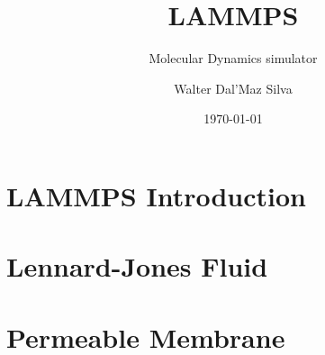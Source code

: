 \documentclass[aspectratio=169]{beamer}
\title{LAMMPS}
\subtitle{Molecular Dynamics simulator}
\author{Walter Dal'Maz Silva}
\date{\today}
\begin{document}
\maketitle

\section{LAMMPS Introduction}


\section{Lennard-Jones Fluid}


\section{Permeable Membrane}

\end{document}
